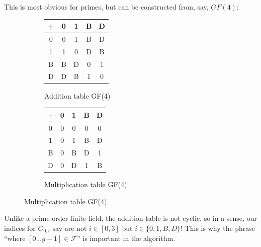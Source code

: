 \documentclass[11pt, oneside]{article} 	%
\begin{document}
This is most obvious for primes, but can be constructed from, say, $GF(4):$

\begin{figure}[!htb]
\centering
\begin{subfigure}{.3\textwidth}
 \centering
 \begin{tabular}{c | c c c c}
  + & 0 & 1 & B & D \\
\hline
  0 & 0 & 1 & B & D \\
  1 & 1 & 0 & D & B \\
  B & B & D & 0 & 1 \\
  D & D & B & 1 & 0 \\
  \end{tabular}
 \caption{Addition table GF(4)}
\label{fig:gf-add}
\end{subfigure}
\begin{subfigure}{.3\textwidth}
 \centering
\begin{tabular}{c | c c c c}
  $\cdot$ & 0 & 1 & B & D \\
\hline
  0 & 0 & 0 & 0 & 0 \\
  1 & 0 & 1 & B & D \\
  B & 0 & B & D & 1 \\
  D & 0 & D & 1 & B \\
\end{tabular}
 \caption{Multiplication table GF(4)}
\label{fig:gf-mult}
\end{subfigure}
\end{figure}

Unlike a prime-order finite field, the addition table is not cyclic, so in a sense, our indices for $G_{0,i}$ say are not $i \in [0, 3]$ but $i \in \{0,1,B,D\}$! This is why the phrase ``where $[0...g-1] \in \mathcal{F}$'' is important in the algorithm.
\end{document}
